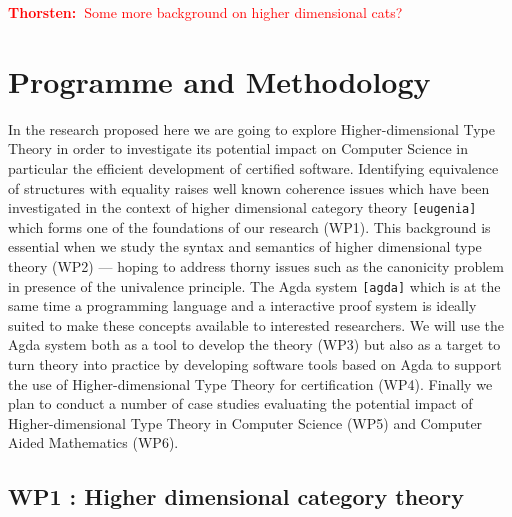 \documentclass[a4paper]{article}
\newcommand{\txa}[1]{\textcolor{red}{\textbf{Thorsten:~}#1}}
\renewcommand{\cite}[1]{{\tt[#1]}}
\begin{document}
\txa{Some more background on higher dimensional cats?}







\section{Programme and Methodology}

In the research proposed here we are going to explore
Higher-dimensional Type Theory in order to investigate its potential
impact on Computer Science in particular the efficient development of
certified software. Identifying equivalence of structures with
equality raises well known coherence issues which have been
investigated in the context of higher dimensional category theory
\cite{eugenia} which forms one of the foundations of our research
(WP1). This background is essential when we study the syntax and
semantics of higher dimensional type theory (WP2) --- hoping to
address thorny issues such as the canonicity problem in presence of
the univalence principle. The Agda system \cite{agda}
which is at the same time a programming language and a interactive
proof system is ideally suited to make these concepts available to
interested researchers. We will use the Agda system both as a tool to
develop the theory (WP3) but also as a target to turn theory into
practice by developing software tools based on Agda to support the use
of Higher-dimensional Type Theory for certification (WP4). Finally we
plan to conduct a number of case studies evaluating the potential
impact of Higher-dimensional Type Theory in Computer Science (WP5) and
Computer Aided Mathematics (WP6).

\subsection*{WP1 : Higher dimensional category theory}
\label{sec:wp:qio}
\end{document}
